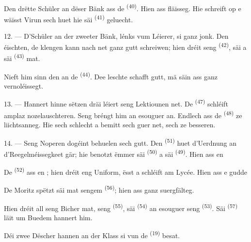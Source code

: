 Den drëtte Schüler an dëser Bänk ass de  \textsuperscript{(40)}. Hien
ass fläisseg. Hie schreift op e wäisst  Virun sech huet hie säi
 \textsuperscript{(41)} geluecht.

12. --- D'Schüler an der zweeter Bänk, lénks vum Léierer, si ganz jonk. Den
éischten, de klengen  kann nach net ganz gutt schreiwen; hien dréit seng
 \textsuperscript{(42)}, säi  a säi
 \textsuperscript{(43)} mat.

Nieft him sinn den  an de  \textsuperscript{(44)}. Dee
leschte schafft gutt, mä säin  ass ganz vernoléissegt.

13. --- Hannert hinne sëtzen dräi  léiert seng
Lektiounen net. De  \textsuperscript{(47)} schléift amplaz
nozelauschteren. Seng  bréngt him  an esouguer
 an. Endlech ass de  \textsuperscript{(48)} ze
liichtsanneg. Hie  sech schlecht a bemitt sech guer net, sech ze
besseren.

14. --- Seng Noperen dogéint behuelen sech gutt. Den 
\textsuperscript{(51)} huet d'Uerdnung an d'Reegelméissegkeet gär; hie benotzt ëmmer
säi  \textsuperscript{(50)} a säi 
\textsuperscript{(49)}. Hien ass en 

De  \textsuperscript{(52)} ass en ; hien dréit
eng Uniform, ësst a schléift am Lycée. Hien ass e gudde 

De Moritz spëtzt säi  mat sengem 
\textsuperscript{(56)}; hien ass ganz suergfälteg.

Hien dréit all seng Bicher mat, seng  \textsuperscript{(55)}, säi
 \textsuperscript{(54)} an esouguer seng 
\textsuperscript{(53)}. Säi  \textsuperscript{(57)} läit um Buedem
hannert him.

Déi zwee Dëscher hannen an der Klass si vun de 
\textsuperscript{(19)} besat.

\VUsaut{4.6mm}
\VUsaut{3.4mm}

